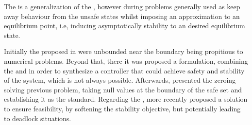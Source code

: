 The  is a generalization of the  \cite{sontag1983lyapunov, ames2014rapidly}, however during problems generally used as keep away behaviour from the unsafe states whilst  imposing an approximation to an equilibrium point, i.e, inducing asymptotically stability to an desired equilibrium state. 

Initially the  proposed in \cite{ames2014control} were unbounded near the boundary being propitious to numerical problems. Beyond that, there it was proposed a  formulation, combining the  and  in order to synthesize a controller that could achieve safety and stability of the system, which is not always possible.  Afterwards, \cite{xu2015robustness} presented the zeroing  solving previous problem, taking null values at the boundary of the safe set and establishing it as the standard. Regarding the , more recently \cite{ames2019control} proposed a solution to ensure feasibility, by softening the stability objective, but potentially leading to deadlock situations.




